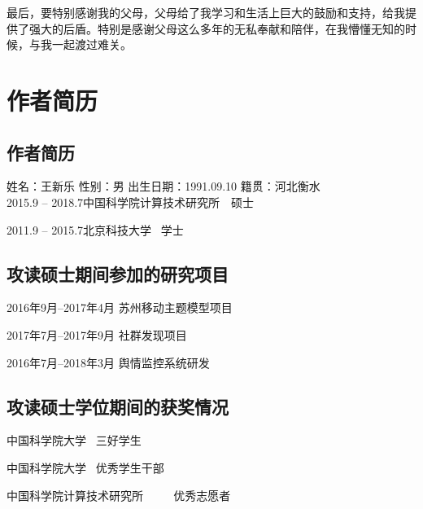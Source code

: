 最后，要特别感谢我的父母，父母给了我学习和生活上巨大的鼓励和支持，给我提供了强大的后盾。特别是感谢父母这么多年的无私奉献和陪伴，在我懵懂无知的时候，与我一起渡过难关。

\chapter{作者简历}


\section*{作者简历}

姓名：王新乐 \qquad 性别：男 \qquad 出生日期：1991.09.10 \qquad 籍贯：河北衡水
\\

2015.9 -- 2018.7\qquad 中国科学院计算技术研究所~\qquad ~硕士 

2011.9 -- 2015.7\qquad 北京科技大学~ \qquad \qquad \qquad \qquad 学士 

\section*{攻读硕士期间参加的研究项目}

\begin{enumerate}[label=\text{[}\arabic*\text{]}]
\item 2016年9月--2017年4月 \qquad 苏州移动主题模型项目
\item 2017年7月--2017年9月 \qquad 社群发现项目
\item 2016年7月--2018年3月 \qquad 舆情监控系统研发
\end{enumerate}

\section*{攻读硕士学位期间的获奖情况}

\begin{enumerate}[label=\text{[}\arabic*\text{]}]
\item 中国科学院大学 \qquad \qquad \qquad ~三好学生
\item 中国科学院大学 \qquad \qquad \qquad ~优秀学生干部
\item 中国科学院计算技术研究所 ~~ ~~优秀志愿者
\end{enumerate}
\cleardoublepage[plain]%

